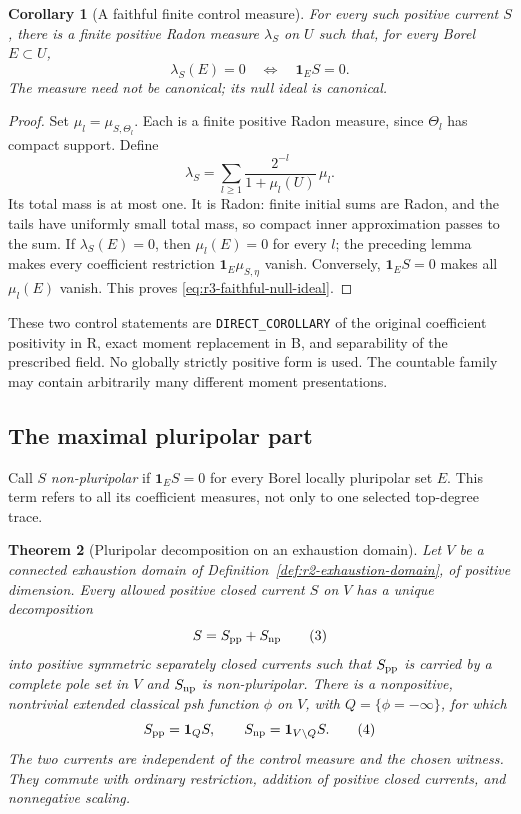 \documentclass[11pt,a4paper]{article}
\numberwithin{equation}{section}
\newtheorem{theorem}{Theorem}[section]
\newtheorem{corollary}[theorem]{Corollary}
\theoremstyle{definition}
\theoremstyle{remark}
\begin{document}
\begin{corollary}[A faithful finite control measure]
\label{cor:r3-faithful-control-measure}
For every such positive current $S$, there is a finite positive
Radon measure $\lambda_S$ on $U$ such that, for every Borel
$E\subset U$,
\[
 \lambda_S(E)=0
 \quad\Longleftrightarrow\quad
 \mathbf1_E S=0.
 \tag{2}\label{eq:r3-faithful-null-ideal}
\]
The measure need not be canonical; its null ideal is canonical.
\end{corollary}

\begin{proof}
Set $\mu_l=\mu_{S,\Theta_l}$. Each is a finite positive
Radon measure, since $\Theta_l$ has compact support. Define
\[
 \lambda_S=\sum_{l\geq1}
       \frac{2^{-l}}{1+\mu_l(U)}\,\mu_l.
\]
Its total mass is at most one. It is Radon: finite initial
sums are Radon, and the tails have uniformly small total
mass, so compact inner approximation passes to the sum.
If $\lambda_S(E)=0$, then $\mu_l(E)=0$ for every $l$;
the preceding lemma makes every coefficient restriction
$\mathbf1_E\mu_{S,\eta}$ vanish. Conversely,
$\mathbf1_E S=0$ makes all $\mu_l(E)$ vanish. This proves
\eqref{eq:r3-faithful-null-ideal}.
\end{proof}

These two control statements are \texttt{DIRECT\_COROLLARY}
of the original coefficient positivity in R, exact moment
replacement in B, and separability of the prescribed field.
No globally strictly positive form is used. The countable
family may contain arbitrarily many different moment
presentations.

\subsection{The maximal pluripolar part}

Call $S$ \emph{non-pluripolar} if
$\mathbf1_E S=0$ for every Borel locally pluripolar set $E$.
This term refers to all its coefficient measures, not only
to one selected top-degree trace.

\begin{theorem}[Pluripolar decomposition on an exhaustion domain]
\label{thm:r3-pluripolar-decomposition}
Let $V$ be a connected exhaustion domain of
Definition~\ref{def:r2-exhaustion-domain}, of positive dimension.
Every allowed positive closed current $S$ on $V$ has a unique
decomposition
\[
 S=S_{\rm pp}+S_{\rm np}
 \tag{3}\label{eq:r3-polar-decomposition}
\]
into positive symmetric separately closed currents such that
$S_{\rm pp}$ is carried by a complete pole set in $V$ and
$S_{\rm np}$ is non-pluripolar.
There is a nonpositive, nontrivial extended classical psh
function $\phi$ on $V$, with $Q=\{\phi=-\infty\}$, for which
\[
 S_{\rm pp}=\mathbf1_QS,
 \qquad S_{\rm np}=\mathbf1_{V\setminus Q}S.
 \tag{4}\label{eq:r3-polar-split-by-witness}
\]
The two currents are independent of the control measure and
the chosen witness. They commute with ordinary restriction,
addition of positive closed currents, and nonnegative scaling.
\end{theorem}
\end{document}
